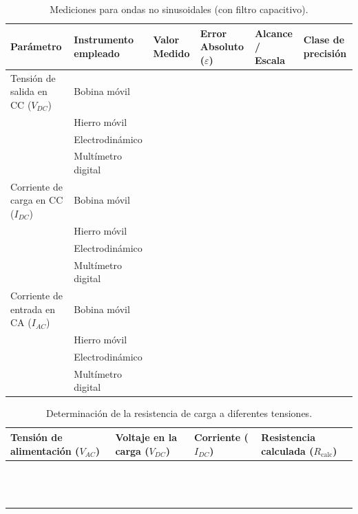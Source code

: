 \begin{table}[H]
\centering
\footnotesize
\begin{tabularx}{\textwidth}{| >{\hsize}Y | >{\hsize}Y | >{\hsize}Y | >{\hsize}Y | >{\hsize}Y | >{\hsize}Y |}
\hline
Parámetro & Instrumento empleado & Valor Medido & Error Absoluto ($\varepsilon$) & Alcance / Escala & Clase de precisión \\ \hline
Tensión de salida en CC ($V_{DC}$) & Bobina móvil & & & & \\ 
 & Hierro móvil & & & & \\ 
 & Electrodinámico & & & & \\ 
 & Multímetro digital & & & & \\ \hline
Corriente de carga en CC ($I_{DC}$) & Bobina móvil & & & & \\ 
 & Hierro móvil & & & & \\ 
 & Electrodinámico & & & & \\ 
 & Multímetro digital & & & & \\ \hline
Corriente de entrada en CA ($I_{AC}$) & Bobina móvil & & & & \\ 
 & Hierro móvil & & & & \\ 
 & Electrodinámico & & & & \\ 
 & Multímetro digital & & & & \\ \hline
\end{tabularx}
\caption{Mediciones para ondas no sinusoidales (con filtro capacitivo).}
\label{tab:mediciones-no-sinusoidales}
\end{table}

\begin{table}[H]
\centering
\begin{tabularx}{\textwidth}{|Y|Y|Y|Y|}
\hline
Tensión de alimentación ($V_{AC}$) & Voltaje en la carga ($V_{DC}$) & Corriente ($I_{DC}$) & Resistencia calculada ($R_{\text{calc}}$) \\ \hline
 & & & \\ \hline
 & & & \\ \hline
 & & & \\ \hline
 & & & \\ \hline
 & & & \\ \hline
 & & & \\ \hline
 & & & \\ \hline
 & & & \\ \hline
 & & & \\ \hline
 & & & \\ \hline
 & & & \\ \hline
 & & & \\ \hline
 & & & \\ \hline
\end{tabularx}
\caption{Determinación de la resistencia de carga a diferentes tensiones.}
\label{tab:resistencia-carga}
\end{table}
